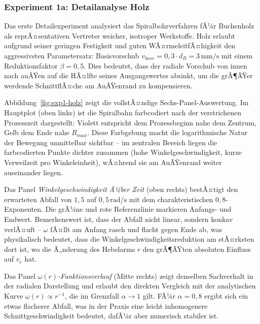 ﻿\documentclass[12pt,a4paper]{article}
\begin{document}
\subsubsection{Experiment 1a: Detailanalyse Holz}

Das erste Detailexperiment analysiert das Spiralbohrverfahren fÃ¼r Buchenholz als reprÃ¤sentativen Vertreter weicher, isotroper Werkstoffe. Holz erlaubt aufgrund seiner geringen Festigkeit und guten WÃ¤rmeleitfÃ¤higkeit den aggressivsten Parametersatz: Basisvorschub $v_{base} = 0{,}3 \cdot d_B = 3\,\text{mm/s}$ mit einem Reduktionsfaktor $\beta = 0{,}5$. Dies bedeutet, dass der radiale Vorschub von innen nach auÃŸen auf die HÃ¤lfte seines Ausgangswertes absinkt, um die grÃ¶ÃŸer werdende SchnittflÃ¤che am AuÃŸenrand zu kompensieren.

Abbildung~\ref{fig:exp1-holz} zeigt die vollstÃ¤ndige Sechs-Panel-Auswertung. Im Hauptplot (oben links) ist die Spiralbahn farbcodiert nach der verstrichenen Prozesszeit dargestellt: Violett entspricht dem Prozessbeginn nahe dem Zentrum, Gelb dem Ende nahe $R_{max}$. Diese Farbgebung macht die logarithmische Natur der Bewegung unmittelbar sichtbar -- im zentralen Bereich liegen die farbcodierten Punkte dichter zusammen (hohe Winkelgeschwindigkeit, kurze Verweilzeit pro Winkeleinheit), wÃ¤hrend sie am AuÃŸenrand weiter auseinander liegen.

Das Panel \textit{Winkelgeschwindigkeit Ã¼ber Zeit} (oben rechts) bestÃ¤tigt den erwarteten Abfall von $1{,}5$ auf $0{,}5\,\text{rad/s}$ mit dem charakteristischen $0{,}8$-Exponenten. Die grÃ¼ne und rote Referenzlinie markieren Anfangs- und Endwert. Bemerkenswert ist, dass der Abfall nicht linear, sondern konkav verlÃ¤uft -- $\omega$ fÃ¤llt am Anfang rasch und flacht gegen Ende ab, was physikalisch bedeutet, dass die Winkelgeschwindigkeitsreduktion am stÃ¤rksten dort ist, wo die Ã„nderung des Hebelarms $r$ den grÃ¶ÃŸten absoluten Einfluss auf $v_c$ hat.

Das Panel \textit{$\omega(r)$-Funktionsverlauf} (Mitte rechts) zeigt denselben Sachverhalt in der radialen Darstellung und erlaubt den direkten Vergleich mit der analytischen Kurve $\omega(r) \propto r^{-1}$, die im Grenzfall $\alpha \to 1$ gilt. FÃ¼r $\alpha = 0{,}8$ ergibt sich ein etwas flacherer Abfall, was in der Praxis eine leicht inhomogenere Schnittgeschwindigkeit bedeutet, dafÃ¼r aber numerisch stabiler ist.
\end{document}
